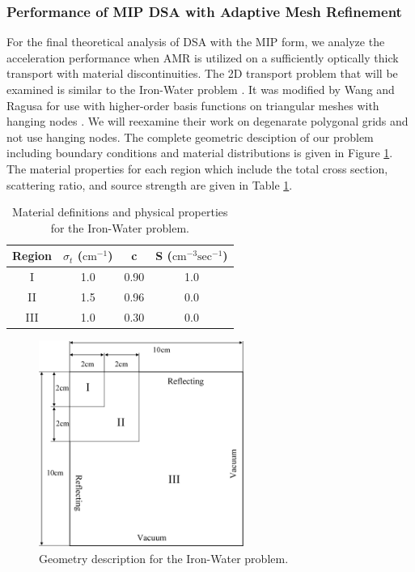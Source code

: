 \subsubsection{Performance of MIP DSA with Adaptive Mesh Refinement}
\label{sec::DSA_Results_1G_AMR}

For the final theoretical analysis of DSA with the MIP form, we analyze the acceleration performance when AMR is utilized on a sufficiently optically thick transport with material discontinuities. The 2D transport problem that will be examined is similar to the Iron-Water problem \cite{khalil1985nodal}. It was modified by Wang and Ragusa for use with higher-order basis functions on triangular meshes with hanging nodes \cite{ref::DSA_wang_ragusa}. We will reexamine their work on degenarate polygonal grids and not use hanging nodes. The complete geometric desciption of our problem including boundary conditions and material distributions is given in Figure \ref{fig::DSA_IW_Description}. The material properties for each region which include the total cross section, scattering ratio, and source strength are given in Table \ref{tab::DSA_IW_mats}.


\begin{table}
\caption{Material definitions and physical properties for the Iron-Water problem.}
\centering
\def\arraystretch{1.2}
\begin{tabular}{|c|c|c|c|}
\hline
Region & $\sigma_t$ ($\text{cm}^{-1}$) & c  & S ($\text{cm}^{-3} \text{sec}^{-1}$) \\
\hline
I & 1.0 & 0.90 & 1.0 \\
\hline
II & 1.5 & 0.96 & 0.0 \\
\hline
III & 1.0 & 0.30 & 0.0\\
\hline
\end{tabular}
\label{tab::DSA_IW_mats}
\end{table}

\begin{figure}
\centering
\includegraphics[width=0.60\textwidth]{figures/sec_DSA/IW_Description.png}
\caption{Geometry description for the Iron-Water problem.}
\label{fig::DSA_IW_Description}
\end{figure}

